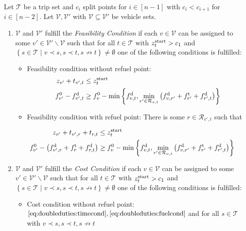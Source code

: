 \begin{definition}[Conditions]
\label{def:conditions}

Let $\mathcal{T}$ be a trip set and $c_i$ split points for ${i\in[n-1]}$ with $c_i<c_{i+1}$ for ${i\in[n-2]}$. Let $\mathcal{V}, \mathcal{V}'$ with $\mathcal{V}\subseteq\mathcal{V}'$ be vehicle sets.
\begin{enumerate}
	\item $\mathcal{V}$ and $\mathcal{V}'$ fulfill the \emph{Feasibility Condition} if each $v\in\mathcal{V}$ can be assigned to some ${v'\in\mathcal{V}'\backslash\mathcal{V}}$ such that for all ${t\in\mathcal{T}}$ with ${z^{\operatorname{start}}_t>c_1}$ and ${\left\{s\in\mathcal{T}\mid v\prec s, s\prec t, s\not\to t\right\}\neq\emptyset}$ one of the following conditions is fulfilled:
	\begin{itemize}
		\item Feasibility condition without refuel point:
			\begin{align}
				z_{v'} + t_{v',t} & \leq z^{\operatorname{start}}_t \label{eq:doubleduties:timecond} \\
				f^0_{v'} - f^{\operatorname{d}}_{v',t} & \geq f^0_v - \min\left\{f^{\operatorname{d}}_{v,t},\min_{r'\in\mathcal{R}_{v,t}}\left(f^{\operatorname{d}}_{v,r'}+f^{\operatorname{t}}_{r'}+f^{\operatorname{d}}_{r',t}\right)\right\} \label{eq:doubleduties:fuelcond}
			\end{align}
		\item Feasibility condition with refuel point: There is some ${r\in\mathcal{R}_{v',t}}$ such that
		\end{itemize}
			\begin{align}
				z_{v'} + t_{v',r} + t_{r,t} & \leq z^{\operatorname{start}}_t \label{eq:doubleduties:timecond_r} \\
				f^0_{v'} - \left(f^{\operatorname{d}}_{v',r} + f^{\operatorname{t}}_r + f^{\operatorname{d}}_{r,t}\right) & \geq f^0_v - \min\left\{f^{\operatorname{d}}_{v,t},\min_{r'\in\mathcal{R}_{v,t}}\left(f^{\operatorname{d}}_{v,r'}+f^{\operatorname{t}}_{r'}+f^{\operatorname{d}}_{r',t}\right)\right\} \label{eq:doubleduties:fuelcond_r}
			\end{align}
	\item $\mathcal{V}$ and $\mathcal{V}'$ fulfill the \emph{Cost Condition} if each $v\in\mathcal{V}$ can be assigned to some ${v'\in\mathcal{V}'\backslash\mathcal{V}}$ such that for all ${t\in\mathcal{T}}$ with ${z^{\operatorname{start}}_t>c_1}$ and ${\left\{s\in\mathcal{T}\mid v\prec s, s\prec t, s\not\to t\right\}\neq\emptyset}$ one of the following conditions is fulfilled:
	\begin{itemize}
		\item Cost condition without refuel point: $\eqref{eq:doubleduties:timecond}, \eqref{eq:doubleduties:fuelcond}$ and for all $s\in\mathcal{T}$ with ${v\prec s, s\prec t, s\not\to t}$

\end{itemize}
\end{enumerate}
\end{definition}
